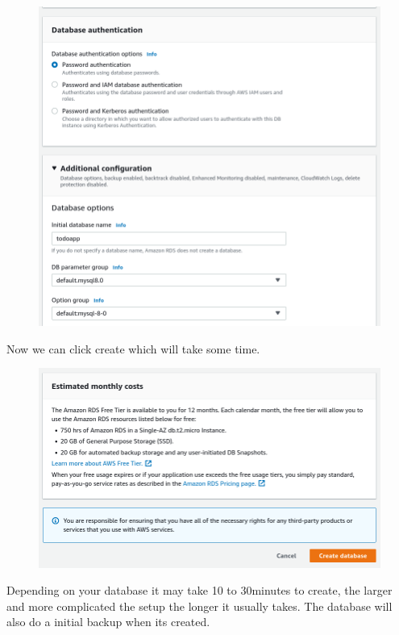 \documentclass{csse4400}
\begin{document}
\begin{figure}[H]
  \includegraphics[width=\textwidth]{images/db7}
\end{figure}

Now we can click create which will take some time.

\begin{figure}[H]
  \includegraphics[width=\textwidth]{images/db8}
\end{figure}

Depending on your database it may take 10 to 30minutes to create, the larger and more complicated the setup the longer it usually takes.
The database will also do a initial backup when its created.
\end{document}
